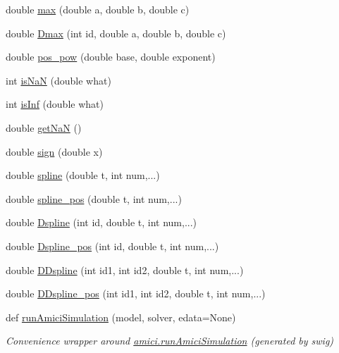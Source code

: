 \begin{DoxyCompactItemize}
\item 
double \mbox{\hyperlink{namespaceamici_a98d705fa2f3a5e7566f99fc26d1573de}{max}} (double a, double b, double c)
\item 
double \mbox{\hyperlink{namespaceamici_a9afb37cc1fa38a1bfa427f9c27255e5b}{Dmax}} (int id, double a, double b, double c)
\item 
double \mbox{\hyperlink{namespaceamici_af596fe82a4ff6588a527a73d659c4db6}{pos\+\_\+pow}} (double base, double exponent)
\item 
int \mbox{\hyperlink{namespaceamici_a7452657cd5f8d541f9e823df5e82c516}{is\+NaN}} (double what)
\item 
int \mbox{\hyperlink{namespaceamici_a10c0a2eb43575a155a34f5bb280f7973}{is\+Inf}} (double what)
\item 
double \mbox{\hyperlink{namespaceamici_ad41a03e53c2aaeeb82aad5791bf3ee28}{get\+NaN}} ()
\item 
double \mbox{\hyperlink{namespaceamici_a8f3cba07aa75b7320ae8bd6c0aeac498}{sign}} (double x)
\item 
double \mbox{\hyperlink{namespaceamici_a34f81e95053af0b2d366f7ab636e603a}{spline}} (double t, int num,...)
\item 
double \mbox{\hyperlink{namespaceamici_aa814c7e3b7d45495d0607f3af88027f6}{spline\+\_\+pos}} (double t, int num,...)
\item 
double \mbox{\hyperlink{namespaceamici_ad4f5bcfd873d2945ed546194aa80c078}{Dspline}} (int id, double t, int num,...)
\item 
double \mbox{\hyperlink{namespaceamici_a0d1393ca0920ddb402450709cc505f4f}{Dspline\+\_\+pos}} (int id, double t, int num,...)
\item 
double \mbox{\hyperlink{namespaceamici_a5597be7f476a91dab4b6e948b548e14c}{D\+Dspline}} (int id1, int id2, double t, int num,...)
\item 
double \mbox{\hyperlink{namespaceamici_af6b968fef628d77ae0e9ad63e6e2558b}{D\+Dspline\+\_\+pos}} (int id1, int id2, double t, int num,...)
\item 
def \mbox{\hyperlink{namespaceamici_a9501315e2c79e5787a62c57c05ffe7c0}{run\+Amici\+Simulation}} (model, solver, edata=None)
\begin{DoxyCompactList}\small\item\em Convenience wrapper around \mbox{\hyperlink{namespaceamici_a46331a204e7511587acc2cc0b1ce7ed0}{amici.\+run\+Amici\+Simulation}} (generated by swig) \end{DoxyCompactList}\item 

\end{DoxyCompactItemize}
